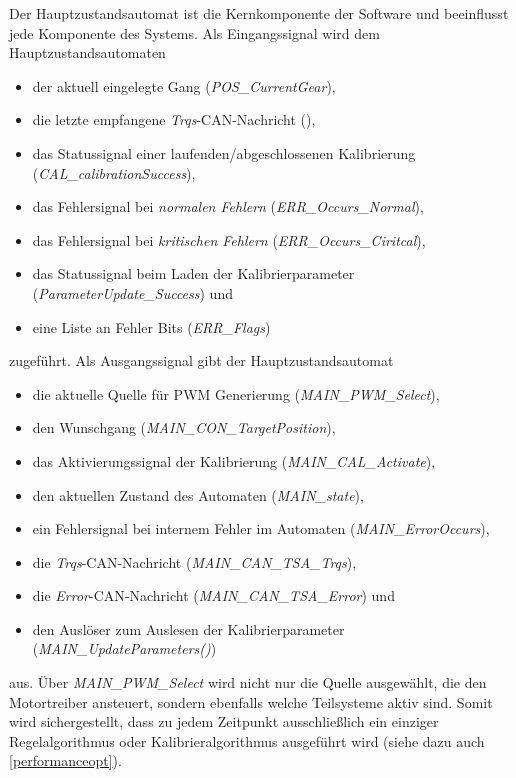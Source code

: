 Der Hauptzustandsautomat ist die Kernkomponente der Software und beeinflusst jede Komponente des Systems. Als Eingangssignal wird dem Hauptzustandsautomaten
\begin{itemize}
	\item der aktuell eingelegte Gang (\textit{POS\_CurrentGear}),
	\item die letzte empfangene \textit{Trqs}-CAN-Nachricht (),
	\item das Statussignal einer laufenden/abgeschlossenen Kalibrierung (\textit{CAL\_calibrationSuccess}),
	\item das Fehlersignal bei \textit{normalen Fehlern} (\textit{ERR\_Occurs\_Normal}),
	\item das Fehlersignal bei \textit{kritischen Fehlern} (\textit{ERR\_Occurs\_Ciritcal}),
	\item das Statussignal beim Laden der Kalibrierparameter (\textit{ParameterUpdate\_Success}) und
	\item eine Liste an Fehler Bits (\textit{ERR\_Flags})
\end{itemize}
zugeführt. Als Ausgangssignal gibt der Hauptzustandsautomat
\begin{itemize}
	\item die aktuelle Quelle für PWM Generierung (\textit{MAIN\_PWM\_Select}),
	\item den Wunschgang (\textit{MAIN\_CON\_TargetPosition}),
	\item das Aktivierungssignal der Kalibrierung  (\textit{MAIN\_CAL\_Activate}),
	\item den aktuellen Zustand des Automaten  (\textit{MAIN\_state}),
	\item ein Fehlersignal bei internem Fehler im Automaten  (\textit{MAIN\_ErrorOccurs}),
	\item die \textit{Trqs}-CAN-Nachricht  (\textit{MAIN\_CAN\_TSA\_Trqs}),
	\item die \textit{Error}-CAN-Nachricht  (\textit{MAIN\_CAN\_TSA\_Error}) und
	\item den Auslöser zum Auslesen der Kalibrierparameter  (\textit{MAIN\_UpdateParameters()})
\end{itemize}
aus. Über \textit{MAIN\_PWM\_Select} wird nicht nur die Quelle ausgewählt, die den Motortreiber ansteuert, sondern ebenfalls welche Teilsysteme aktiv sind. Somit wird sichergestellt, dass zu jedem Zeitpunkt ausschließlich ein einziger Regelalgorithmus oder Kalibrieralgorithmus ausgeführt wird (siehe dazu auch \autoref{performanceopt}).\\
